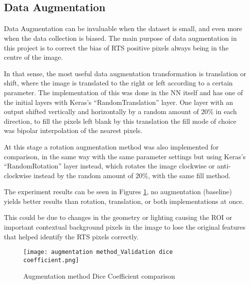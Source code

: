 \subsection{Data Augmentation}
\paragraph{}
Data Augmentation can be invaluable when the dataset is small, and even more when the data collection is biased. The main purpose of data augmentation in this project is to correct the bias of \gls{RTS} positive pixels always being in the centre of the image.

In that sense, the most useful data augmentation transformation is translation or shift, where the image is translated to the right or left according to a certain parameter. The implementation of this was done in the \gls{NN} itself and has one of the initial layers with Keras's “RandomTranslation” layer. One layer with an output shifted vertically and horizontally by a random amount of $20\%$ in each direction, to fill the pixels left blank by this translation the fill mode of choice was bipolar interpolation of the nearest pixels.

At this stage a rotation augmentation method was also implemented for comparison, in the same way with the same parameter settings but using Keras's “RandomRotation” layer instead, which rotates the image clockwise or anti-clockwise instead by the random amount of $20\%$, with the same fill method. 

The experiment results can be seen in Figures \ref{aug_dice}, no augmentation (baseline) yields better results than rotation, translation, or both implementations at once.

This could be due to changes in the geometry or lighting causing the \gls{ROI} or important contextual background pixels in the image to lose the original features that helped identify the \gls{RTS} pixels correctly.

\begin{figure}[hbt!]
    \centering
    \texttt{[image: augmentation method\_Validation dice coefficient.png]}
    \caption{Augmentation method Dice Coefficient comparison}
    \label{aug_dice}
\end{figure}

